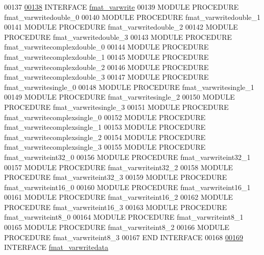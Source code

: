 \begin{DoxyCode}
00137 
\hyperlink{interfacematio_1_1fmat__varwrite}{00138}     \textcolor{keyword}{INTERFACE} \hyperlink{interfacematio_1_1fmat__varwrite}{fmat\_varwrite}
00139         \textcolor{keyword}{MODULE PROCEDURE} fmat\_varwritedouble\_0
00140         \textcolor{keyword}{MODULE PROCEDURE} fmat\_varwritedouble\_1
00141         \textcolor{keyword}{MODULE PROCEDURE} fmat\_varwritedouble\_2
00142         \textcolor{keyword}{MODULE PROCEDURE} fmat\_varwritedouble\_3
00143         \textcolor{keyword}{MODULE PROCEDURE} fmat\_varwritecomplexdouble\_0
00144         \textcolor{keyword}{MODULE PROCEDURE} fmat\_varwritecomplexdouble\_1
00145         \textcolor{keyword}{MODULE PROCEDURE} fmat\_varwritecomplexdouble\_2
00146         \textcolor{keyword}{MODULE PROCEDURE} fmat\_varwritecomplexdouble\_3
00147         \textcolor{keyword}{MODULE PROCEDURE} fmat\_varwritesingle\_0
00148         \textcolor{keyword}{MODULE PROCEDURE} fmat\_varwritesingle\_1
00149         \textcolor{keyword}{MODULE PROCEDURE} fmat\_varwritesingle\_2
00150         \textcolor{keyword}{MODULE PROCEDURE} fmat\_varwritesingle\_3
00151         \textcolor{keyword}{MODULE PROCEDURE} fmat\_varwritecomplexsingle\_0
00152         \textcolor{keyword}{MODULE PROCEDURE} fmat\_varwritecomplexsingle\_1
00153         \textcolor{keyword}{MODULE PROCEDURE} fmat\_varwritecomplexsingle\_2
00154         \textcolor{keyword}{MODULE PROCEDURE} fmat\_varwritecomplexsingle\_3
00155         \textcolor{keyword}{MODULE PROCEDURE} fmat\_varwriteint32\_0
00156         \textcolor{keyword}{MODULE PROCEDURE} fmat\_varwriteint32\_1
00157         \textcolor{keyword}{MODULE PROCEDURE} fmat\_varwriteint32\_2
00158         \textcolor{keyword}{MODULE PROCEDURE} fmat\_varwriteint32\_3
00159         \textcolor{keyword}{MODULE PROCEDURE} fmat\_varwriteint16\_0
00160         \textcolor{keyword}{MODULE PROCEDURE} fmat\_varwriteint16\_1
00161         \textcolor{keyword}{MODULE PROCEDURE} fmat\_varwriteint16\_2
00162         \textcolor{keyword}{MODULE PROCEDURE} fmat\_varwriteint16\_3
00163         \textcolor{keyword}{MODULE PROCEDURE} fmat\_varwriteint8\_0
00164         \textcolor{keyword}{MODULE PROCEDURE} fmat\_varwriteint8\_1
00165         \textcolor{keyword}{MODULE PROCEDURE} fmat\_varwriteint8\_2
00166         \textcolor{keyword}{MODULE PROCEDURE} fmat\_varwriteint8\_3
00167 \textcolor{keyword}{    END INTERFACE}
00168 
\hyperlink{interfacematio_1_1fmat__varwritedata}{00169}     \textcolor{keyword}{INTERFACE} \hyperlink{interfacematio_1_1fmat__varwritedata}{fmat\_varwritedata}

\end{DoxyCode}
